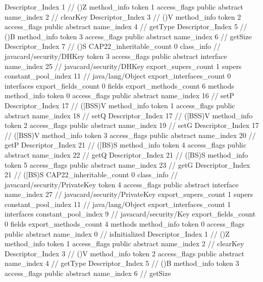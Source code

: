 {{{{{					Descriptor_Index	1		// ()Z
				}
				method_info {
					token	1
					access_flags	public abstract
					name_index	2		// clearKey
					Descriptor_Index	3		// ()V
				}
				method_info {
					token	2
					access_flags	public abstract
					name_index	4		// getType
					Descriptor_Index	5		// ()B
				}
				method_info {
					token	3
					access_flags	public abstract
					name_index	6		// getSize
					Descriptor_Index	7		// ()S
				}
			}
			CAP22_inheritable_count	0
		}
		class_info {		// javacard/security/DHKey
			token	3
			access_flags	public abstract interface
			name_index	25		// javacard/security/DHKey
			export_supers_count	1
			supers {
				constant_pool_index	11		// java/lang/Object
			}
			export_interfaces_count	0
			interfaces {
			}
			export_fields_count	0
			fields {
			}
			export_methods_count	6
			methods {
				method_info {
					token	0
					access_flags	public abstract
					name_index	16		// setP
					Descriptor_Index	17		// ([BSS)V
				}
				method_info {
					token	1
					access_flags	public abstract
					name_index	18		// setQ
					Descriptor_Index	17		// ([BSS)V
				}
				method_info {
					token	2
					access_flags	public abstract
					name_index	19		// setG
					Descriptor_Index	17		// ([BSS)V
				}
				method_info {
					token	3
					access_flags	public abstract
					name_index	20		// getP
					Descriptor_Index	21		// ([BS)S
				}
				method_info {
					token	4
					access_flags	public abstract
					name_index	22		// getQ
					Descriptor_Index	21		// ([BS)S
				}
				method_info {
					token	5
					access_flags	public abstract
					name_index	23		// getG
					Descriptor_Index	21		// ([BS)S
				}
			}
			CAP22_inheritable_count	0
		}
		class_info {		// javacard/security/PrivateKey
			token	4
			access_flags	public abstract interface
			name_index	27		// javacard/security/PrivateKey
			export_supers_count	1
			supers {
				constant_pool_index	11		// java/lang/Object
			}
			export_interfaces_count	1
			interfaces {
				constant_pool_index	9		// javacard/security/Key
			}
			export_fields_count	0
			fields {
			}
			export_methods_count	4
			methods {
				method_info {
					token	0
					access_flags	public abstract
					name_index	0		// isInitialized
					Descriptor_Index	1		// ()Z
				}
				method_info {
					token	1
					access_flags	public abstract
					name_index	2		// clearKey
					Descriptor_Index	3		// ()V
				}
				method_info {
					token	2
					access_flags	public abstract
					name_index	4		// getType
					Descriptor_Index	5		// ()B
				}
				method_info {
					token	3
					access_flags	public abstract
					name_index	6		// getSize
}}}}}
